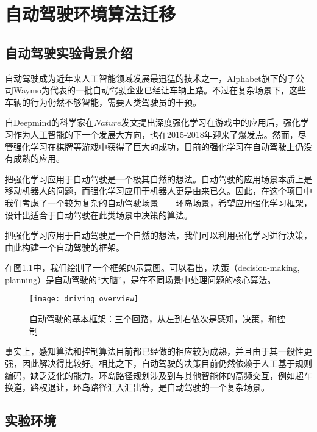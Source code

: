 \chapter{自动驾驶环境算法迁移}
\section{自动驾驶实验背景介绍}
自动驾驶成为近年来人工智能领域发展最迅猛的技术之一，Alphabet旗下的子公司Waymo为代表的一批自动驾驶企业已经让车辆上路\cite{waymo}。不过在复杂场景下，这些车辆的行为仍然不够智能，需要人类驾驶员的干预。\par
自Deepmind的科学家在$Nature$发文提出深度强化学习在游戏中的应用后\cite{nature2015}，强化学习作为人工智能的下一个发展大方向，也在2015-2018年迎来了爆发点。然而，尽管强化学习在棋牌等游戏中获得了巨大的成功，目前的强化学习在自动驾驶上仍没有成熟的应用。\par
把强化学习应用于自动驾驶是一个极其自然的想法。自动驾驶的应用场景本质上是移动机器人的问题，而强化学习应用于机器人更是由来已久\cite{RL_in_robotics}\cite{Model-Based_RL_robotics}\cite{DRL_for_driving}。因此，在这个项目中我们考虑了一个较为复杂的自动驾驶场景——环岛场景，希望应用强化学习框架，设计出适合于自动驾驶在此类场景中决策的算法。

把强化学习应用于自动驾驶是一个自然的想法，我们可以利用强化学习进行决策，由此构建一个自动驾驶的框架\cite{DRL_for_driving}。\par
在图\ref{fig:self-driving_overview}中，我们绘制了一个框架的示意图。可以看出，决策（decision-making, planning）是自动驾驶的``大脑''，是在不同场景中处理问题的核心算法。\par
      \begin{figure}[h] %
        \centering
        \texttt{[image: driving\_overview]}
        \caption{自动驾驶的基本框架：三个回路，从左到右依次是感知，决策，和控制}
        \label{fig:self-driving_overview}
      \end{figure}
事实上，感知算法和控制算法目前都已经做的相应较为成熟，并且由于其一般性更强，因此解决得比较好。相比之下，自动驾驶的决策目前仍然依赖于人工基于规则编码，缺乏泛化的能力。环岛路径规划涉及到与其他智能体的高频交互，例如超车换道，路权退让，环岛路径汇入汇出等，是自动驾驶的一个复杂场景。

  
\section{实验环境}
